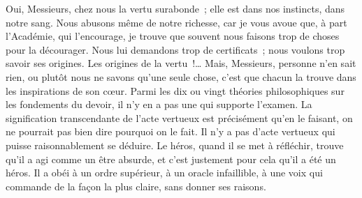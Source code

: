 \documentclass[french,twoside]{book} %
\newcommand\orgName[1]{#1}
\begin{document}
Oui, Messieurs, chez nous la vertu surabonde ; elle est dans nos instincts, dans notre sang. Nous abusons même de notre richesse, car je vous avoue que, à part l’{\orgName Académie}, qui l’encourage, je trouve que souvent nous faisons trop de choses pour la décourager. Nous lui demandons trop de certificats ; nous voulons trop savoir ses origines. Les origines de la vertu !… Mais, Messieurs, personne n’en sait rien, ou plutôt nous ne savons qu’une seule chose, c’est que chacun la trouve dans les inspirations de son cœur. Parmi les dix ou vingt théories philosophiques sur les fondements du devoir, il n’y en a pas une qui supporte l’examen. La signification transcendante de l’acte vertueux est précisément qu’en le faisant, on ne pourrait pas bien dire pourquoi on le fait. Il n’y a pas d’acte vertueux qui puisse raisonnablement se déduire. Le héros, quand il se met à réfléchir, trouve qu’il a agi comme un être absurde, et c’est justement pour cela qu’il a été un héros. Il a obéi à un ordre supérieur, à un oracle infaillible, à une voix qui commande de la façon la plus claire, sans donner ses raisons.\par
\end{document}
